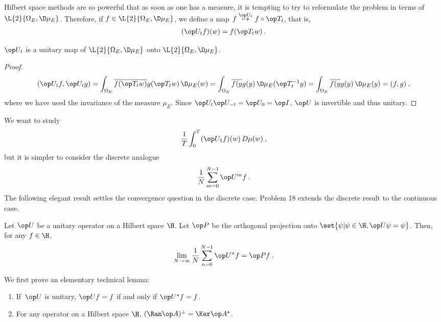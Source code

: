 Hilbert space methods are so powerful that as soon as one has a measure, it is tempting to try to reformulate the problem in terms of $\L{2}{\Omega_E, \D \mu_E}$.
Therefore, if $f \in \L{2}{\Omega_E, \D \mu_E}$, we define a map $f \overset{\op U_t}\mapsto f \circ \op T_t$, that is, \begin{align}
    (\op U_t f)(w) = f(\op T_t w) \:.
\end{align}

\begin{lemma}
    $\op U_t$ is a unitary map of $\L{2}{\Omega_E, \D \mu_E}$ onto $\L{2}{\Omega_E, \D \mu_E}$.
\end{lemma}
\begin{proof}
    \begin{align}
        (\op U_t f, \op U_t g) =
         \int_{\Omega_E} \overline{f(\op T_t w)} g(\op T_t w) \, \D \mu_E (w) =
         \int_{\Omega_E} \overline{f(y} g(y) \, \D \mu_E (\op T_t^{-1} y) =
         \int_{\Omega_E} \overline{f(y} g(y) \, \D \mu_E (y) = (f,g) \:,
    \end{align}
    where we have used the invariance of the measure $\mu_E$. Since $\op U_t \op U_{-t} = \op U_0 = \op I$, $\op U$ is invertible and thus unitary.
\end{proof}

We want to study
\begin{align}
    \frac{1}{T} \int_0^T (\op U_1 f)(w) \, D \mu(w) \:,
\end{align}
but it is simpler to consider the discrete analogue \begin{align}
    \frac{1}{N} \sum_{m=0}^{N-1} \op U^m f \:.
\end{align}
The following elegant result settles the convergence question in the discrete case. Problem 18 extends the discrete result to the continuous case.

\begin{theorem}
Let $\op U$ be a unitary operator on a Hilbert space $\H$. Let $\op P$ be the orthogonal projection onto $\set{\psi | \psi \in \H, \op U \psi = \psi}$. Then, for any $f \in \H$,
\begin{align}
    \lim_{N \rightarrow \infty} \frac{1}{N} \sum_{n=0}^{N-1} \op U^n f = \op P f \:. 
\end{align}
\end{theorem}

We first prove an elementary technical lemma:
\begin{lemma}
    \begin{enumerate}
        \item If \,$\op U$ is unitary, $\op U f = f$ if and only if $\op U^\star f = f$.
        \item For any operator on a Hilbert space $\H$, $(\Ran \op A)^\bot = \Ker \op A^\star$.
    \end{enumerate}
\end{lemma}

